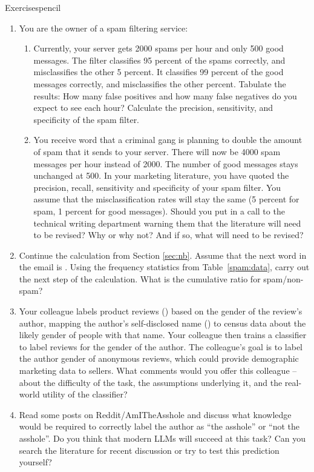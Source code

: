 \begin{tblsfilledsymbol}{Exercises}{pencil}
\begin{enumerate}
\item  You are the owner of a spam filtering service: 

\begin{enumerate}
\item
Currently, your server gets 2000 spams per hour and only 500
good messages. The filter classifies 95 percent of the spams correctly, 
and misclassifies the other 5 percent. It classifies 99 percent of the good
messages correctly, and misclassifies the other percent.
Tabulate the results: How many false positives and how many false
negatives do you expect to see each hour?
Calculate 
 the precision, sensitivity, and specificity of the spam 
filter.
\item
You receive word
that a criminal gang is planning to double the amount of spam that it
sends to your server. There will now be 4000 spam messages per hour
instead of 2000. The number of good messages stays unchanged at 500.
In your marketing literature, you have quoted
the precision, recall, sensitivity and specificity of your spam
filter. You assume that the misclassification rates will stay the
same (5 percent for spam, 1 percent for good messages).
Should you put in a call to the technical writing department
warning them that the literature will need to be revised? Why or why
not? And if so, what will need to be revised?
\end{enumerate}

\item  Continue the calculation from Section \ref{sec:nb}.
	 Assume that the next word in the email is . Using the frequency statistics from Table~\ref{spam:data},
	carry out the next step of the calculation. What is the cumulative ratio for spam/non-spam?

\item  Your colleague labels product reviews () based on the gender of the review's author, mapping the author's self-disclosed name () to census data about the likely gender of people with that name.  Your colleague then trains a classifier to label reviews for the gender of the author.  The colleague's goal is to label the author gender of anonymous reviews, which could provide demographic marketing data to sellers.  What comments would you offer this colleague -- about the difficulty of the task, the assumptions underlying it, and the real-world utility of the classifier?
	

\item   Read some posts on Reddit/AmITheAsshole and discuss what knowledge would be required to correctly label the author as ``the asshole'' or ``not the asshole''.  Do you think that modern LLMs will succeed at this task? Can you search the literature for recent discussion or try to test this prediction yourself?
	


\end{enumerate}
\end{tblsfilledsymbol}
